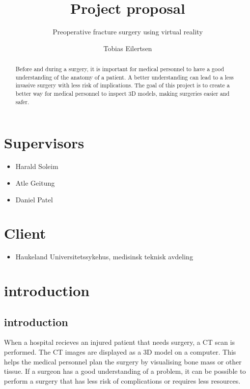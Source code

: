 \documentclass[11pt]{scrartcl}
\begin{document}
\title{Project proposal}
\subtitle{Preoperative fracture surgery using virtual reality}

\author{Tobias Eilertsen}
\maketitle


\section*{Supervisors}
\begin{itemize}
  \item Harald Soleim
  \item Atle Geitung
  \item Daniel Patel
\end{itemize}
\section*{Client}
\begin{itemize}
  \item Haukeland Universitetssykehus, medisinsk teknisk avdeling
\end{itemize}

\begin{abstract}
  Before and during a surgery, it is important for medical personnel to have a
    good understanding of the anatomy of a patient. A better understanding can
    lead to a less invasive surgery with less risk of implications.
  The goal of this project is to create a better way for medical personnel to inspect 3D models, making surgeries easier and safer.
\end{abstract}

\newpage
\section{introduction}


\subsection{introduction}

When a hospital recieves an injured patient that needs surgery, a CT scan is
performed. The CT images are displayed as a 3D model on a computer. This helps
the medical personnel plan the surgery by visualising bone mass or other tissue. If a surgeon has a good understanding of a problem, it can be possible to perform a surgery that has less risk of complications or requires less resources.
\end{document}
